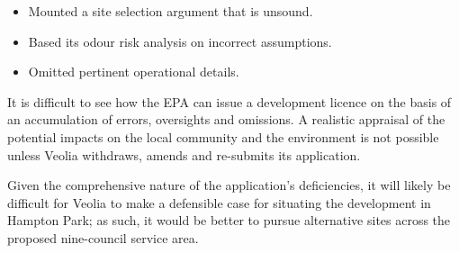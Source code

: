 \documentclass[12pt]{article}
\begin{document}
\begin{itemize}
  \item Mounted a site selection argument that is unsound.
  \item Based its odour risk analysis on incorrect assumptions.
  \item Omitted pertinent operational details.
\end{itemize}

It is difficult to see how the EPA can issue a development licence on the basis of an accumulation of errors, oversights and omissions. A realistic appraisal of the potential impacts on the local community and the environment is not possible unless Veolia withdraws, amends and re-submits its application. 

Given the comprehensive nature of the application's deficiencies, it will likely be difficult for Veolia to make a defensible case for situating the development in Hampton Park; as such, it would be better to pursue alternative sites across the proposed nine-council service area.

\sloppy
\printbibliography
\end{document}
